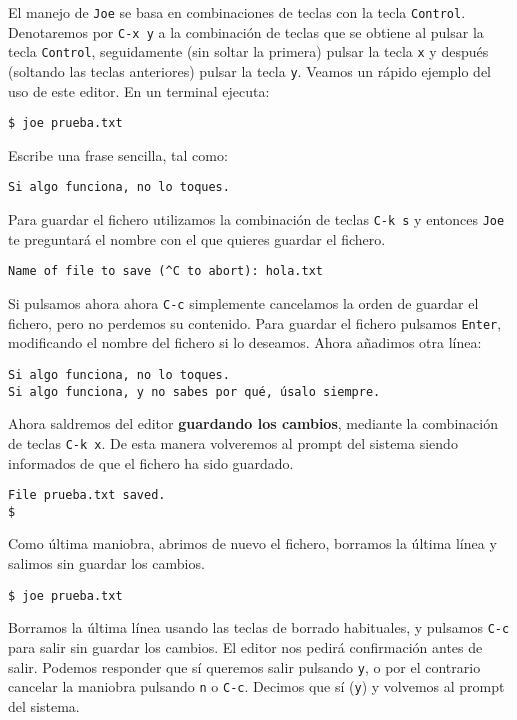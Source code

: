 El manejo de {\tt Joe} se basa en combinaciones de teclas con la tecla
{\tt Control}. Denotaremos por {\tt C-x  y} a la combinación de teclas
que se  obtiene al  pulsar la tecla  {\tt Control},  seguidamente (sin
soltar la  primera) pulsar la  tecla {\tt  x} y después  (soltando las
teclas anteriores) pulsar  la tecla {\tt y}. Veamos  un rápido ejemplo
del uso de este editor. En un terminal ejecuta:

\begin{verbatim}
$ joe prueba.txt
\end{verbatim}

Escribe una frase sencilla, tal como:

\begin{verbatim}
Si algo funciona, no lo toques.
\end{verbatim}

Para guardar el  fichero utilizamos la combinación de  teclas {\tt C-k
s} y  entonces {\tt Joe}  te preguntará el  nombre con el  que quieres
guardar el fichero.

\begin{verbatim}
Name of file to save (^C to abort): hola.txt
\end{verbatim}

Si pulsamos ahora  ahora {\tt C-c} simplemente cancelamos  la orden de
guardar el  fichero, pero  no perdemos su  contenido. Para  guardar el
fichero pulsamos {\tt Enter}, modificando  el nombre del fichero si lo
deseamos. Ahora añadimos otra línea:

\begin{verbatim}
Si algo funciona, no lo toques.
Si algo funciona, y no sabes por qué, úsalo siempre.
\end{verbatim}

Ahora saldremos  del editor {\bf  guardando los cambios},  mediante la
combinación de teclas {\tt C-k x}. De esta manera volveremos al prompt
del sistema siendo informados de que el fichero ha sido guardado.

\begin{verbatim}
File prueba.txt saved.
$
\end{verbatim}

Como última maniobra, abrimos de  nuevo el fichero, borramos la última
línea y salimos sin guardar los cambios.


\begin{verbatim}
$ joe prueba.txt
\end{verbatim}

Borramos la  última línea  usando las teclas  de borrado  habituales, y
pulsamos {\tt C-c}  para salir sin guardar los cambios.  El editor nos
pedirá confirmación antes de salir.  Podemos responder que sí queremos
salir  pulsando {\tt  y},  o  por el  contrario  cancelar la  maniobra
pulsando {\tt n} o  {\tt C-c}. Decimos que sí ({\tt  y}) y volvemos al
prompt del sistema.

